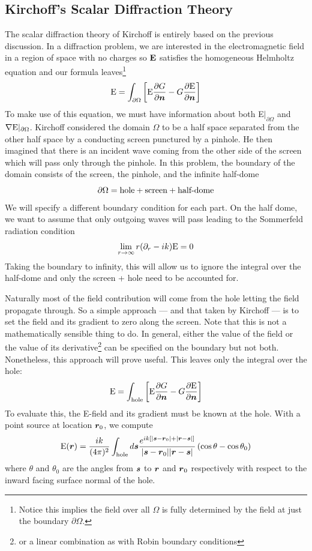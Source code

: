 \documentclass[twocolumn]{gwclass}
\newcommand{\bt}[1]{\text{\textbf{#1}}}
\begin{document}
	\subsection{Kirchoff's Scalar Diffraction Theory}
	The scalar diffraction theory of Kirchoff is entirely based on the previous discussion. In a diffraction problem, we are interested in the electromagnetic field in a region of space with no charges so $\bt{E}$ satisfies the homogeneous Helmholtz equation and our formula leaves\footnote{Notice this implies the field over all $\Omega$ is fully determined by the field at just the boundary $\partial\Omega$. }
	$$ \text{\normalfont{E}} = \int_{\partial\Omega}\left[ \text{\normalfont{E}}\frac{\partial G}{\partial \boldsymbol{n}} - G\frac{\partial \text{\normalfont{E}}}{\partial \boldsymbol{n}}\right] $$
	To make use of this equation, we must have information about both E$|_{\partial\Omega}$ and $\nabla \text{\normalfont{E}}|_{\partial\Omega}$. 
	Kirchoff considered the domain $\Omega$ to be a half space separated from the other half space by a conducting screen punctured by a pinhole. He then imagined that there is an incident wave coming from the other side of the screen which will pass only through the pinhole. In this problem, the boundary of the domain consists of the screen, the pinhole, and the infinite half-dome
	$$ \partial\Omega = \text{\normalfont{hole}} + \text{\normalfont{screen}} + \text{\normalfont{half-dome}} $$
	We will specify a different boundary condition for each part. On the half dome, we want to assume that only outgoing waves will pass leading to the Sommerfeld radiation condition
	$$ \lim_{r\to\infty} r(\partial_r - ik)\text{\normalfont{E}} = 0 $$
	Taking the boundary to infinity, this will allow us to ignore the integral over the half-dome and only the screen + hole need to be accounted for.
	
	Naturally most of the field contribution will come from the hole letting the field propagate through. So a simple approach --- and that taken by Kirchoff --- is to set the field and its gradient to zero along the screen. Note that this is not a mathematically sensible thing to do. In general, either the value of the field or the value of its derivative\footnote{or a linear combination as with Robin boundary conditions} can be specified on the boundary but not both. Nonetheless, this approach will prove useful. This leaves only the integral over the hole:
	$$ \text{\normalfont{E}} = \int_{\text{\normalfont{hole}}}\left[ \text{\normalfont{E}}\frac{\partial G}{\partial \boldsymbol{n}} - G\frac{\partial \text{\normalfont{E}}}{\partial \boldsymbol{n}}\right] $$
	To evaluate this, the E-field and its gradient must be known at the hole. With a point source at location $\boldsymbol{r}_0$, we compute
	$$ \text{\normalfont{E}}(\boldsymbol{r}) = \frac{ik}{(4\pi)^2}\int_{\text{\normalfont{hole}}} d\boldsymbol{s}  \frac{e^{ik[|\boldsymbol{s} - \boldsymbol{r}_0| + |\boldsymbol{r} - \boldsymbol{s}|]}}{|\boldsymbol{s} - \boldsymbol{r}_0||\boldsymbol{r} - \boldsymbol{s}|} \left( \cos \theta - \cos\theta_0\right) $$
	where $\theta$ and $\theta_0$ are the angles from $\boldsymbol{s}$ to $\boldsymbol{r}$ and $\boldsymbol{r}_0$ respectively with respect to the inward facing surface normal of the hole.
	
\end{document}
